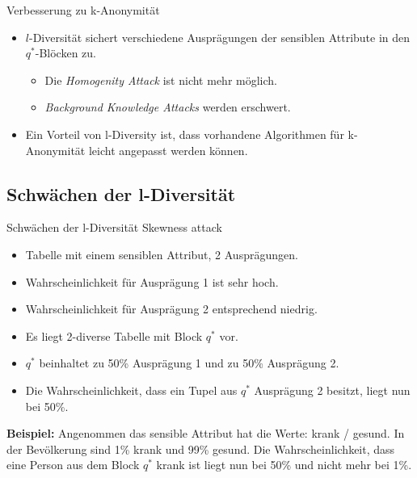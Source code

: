 \begin{frame}{Verbesserung zu k-Anonymität}
	\begin{itemize}
		\item $l$-Diversität sichert verschiedene Ausprägungen der sensiblen Attribute in den \(q^*\)-Blöcken zu.
		\begin{itemize}
			\item Die \textit{Homogenity Attack} ist nicht mehr möglich.
			\item \textit{Background Knowledge Attacks} werden erschwert.
		\end{itemize}
	\end{itemize}
	
	\vfill
	
	\pause
	
	\begin{itemize}
		\item Ein Vorteil von l-Diversity ist, dass vorhandene Algorithmen für k-Anonymität leicht angepasst werden können.
	\end{itemize}
\end{frame}


\subsection{Schwächen der l-Diversität }

\begin{frame}{Schwächen der l-Diversität}
	\large \textcolor{gray!80}{Skewness attack} \normalsize \small\cite{Li2007t-closseness} 
	\begin{itemize}
		\item Tabelle mit einem sensiblen Attribut, 2 Ausprägungen.\\
	    \item Wahrscheinlichkeit für Ausprägung 1 ist sehr hoch.\\
	    \item Wahrscheinlichkeit für Ausprägung 2 entsprechend niedrig.\\
	    \item Es liegt 2-diverse Tabelle mit Block $q^*$ vor.\\
	    \item $q^*$ beinhaltet zu 50\% Ausprägung 1 und zu 50\% Ausprägung 2.\\
	    \item Die Wahrscheinlichkeit, dass ein Tupel aus $q^*$ Ausprägung 2 besitzt, liegt nun bei 50\%.\\
	\end{itemize}
	
	\vfill
	
	\textbf{Beispiel:} Angenommen das sensible Attribut hat die Werte: krank / gesund. In der Bevölkerung sind 1\% krank und 99\% gesund. Die Wahrscheinlichkeit, dass eine Person aus dem Block $q^*$ krank ist liegt nun bei 50\% und nicht mehr bei 1\%.
\end{frame}

